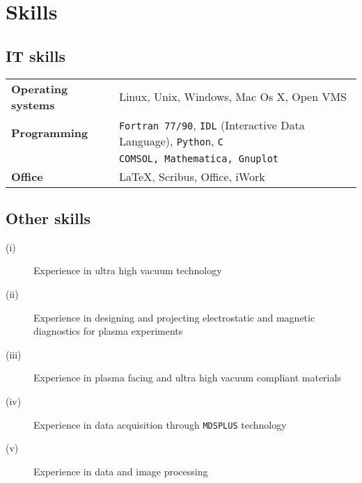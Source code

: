 \section{Skills}

\subsection{IT skills}
\begin{tabular}{ll}
\textbf{Operating systems} & Linux, Unix, Windows, Mac Os X, Open VMS
\\
\textbf{Programming} & \texttt{Fortran 77/90}, \texttt{IDL} (Interactive Data Language),
\texttt{Python}, \texttt{C} \\
 & \texttt{COMSOL, Mathematica, Gnuplot} \\
\textbf{Office} & \LaTeX, Scribus, Office, iWork
\end{tabular}

\subsection{Other skills}
\begin{description}
\item[(i)] Experience in ultra high vacuum technology
\item[(ii)] Experience in designing and projecting electrostatic and
  magnetic diagnostics for plasma experiments
\item[(iii)] Experience in plasma facing and ultra high
  vacuum compliant materials
\item[(iv)] Experience in data acquisition through \texttt{MDSPLUS} technology
\item[(v)] Experience in data and image processing
\end{description}
